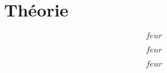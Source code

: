 \section{Théorie}


\begin{equation}
    feur
    \label{eq:viscosite}
\end{equation}

\begin{equation}
    feur
    \label{eq:ln_relation_boltzmann}
\end{equation}

\begin{equation}
    feur
    \label{eq:constante_temps}
\end{equation}
